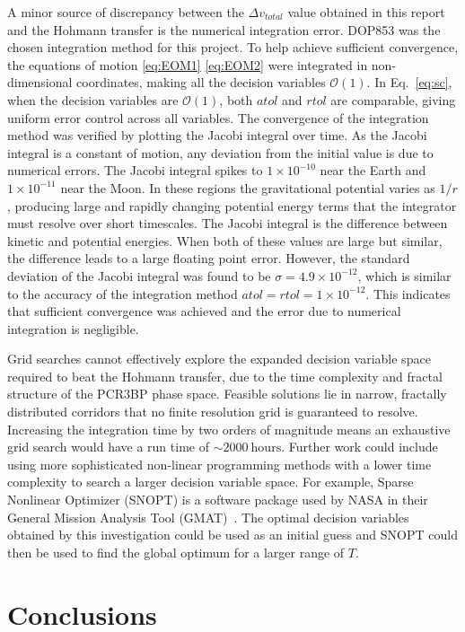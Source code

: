 \documentclass[10pt,twocolumn]{revtex4-2}    %
\begin{document}
A minor source of discrepancy between the $\Delta v_{total}$ value obtained in this report and the Hohmann transfer is the numerical integration error. DOP853 was the chosen integration method for this project. To help achieve sufficient convergence, the equations of motion \eqref{eq:EOM1} \eqref{eq:EOM2} were integrated in non-dimensional coordinates, making all the decision variables $\mathcal{O}(1)$. In Eq.~\ref{eq:sc}, when the decision variables are $\mathcal{O}(1)$, both $atol$ and $rtol$ are comparable, giving uniform error control across all variables. The convergence of the integration method was verified by plotting the Jacobi integral over time. As the Jacobi integral is a constant of motion, any deviation from the initial value is due to numerical errors. The Jacobi integral spikes to $1 \times 10^{-10}$ near the Earth and $1 \times 10^{-11}$ near the Moon. In these regions the gravitational potential varies as $1/r$, producing large and rapidly changing potential energy terms that the integrator must resolve over short timescales. The Jacobi integral is the difference between kinetic and potential energies. When both of these values are large but similar, the difference leads to a large floating point error. However, the standard deviation of the Jacobi integral was found to be $\sigma = 4.9 \times 10^{-12}$, which is similar to the accuracy of the integration method $atol = rtol = 1 \times 10^{-12}$. This indicates that sufficient convergence was achieved and the error due to numerical integration is negligible.

Grid searches cannot effectively explore the expanded decision variable space required to beat the Hohmann transfer, due to the time complexity and fractal structure of the PCR3BP phase space. Feasible solutions lie in narrow, fractally distributed corridors that no finite resolution grid is guaranteed to resolve. Increasing the integration time by two orders of magnitude means an exhaustive grid search would have a run time of $\sim 2000~\mathrm{hours}$. Further work could include using more sophisticated non-linear programming methods with a lower time complexity to search a larger decision variable space. For example, Sparse Nonlinear Optimizer (SNOPT) is a software package used by NASA in their General Mission Analysis Tool (GMAT)~\cite{gill2005, conway2010}. The optimal decision variables obtained by this investigation could be used as an initial guess and SNOPT could then be used to find the global optimum for a larger range of $T$.

\section{Conclusions}
\end{document}
